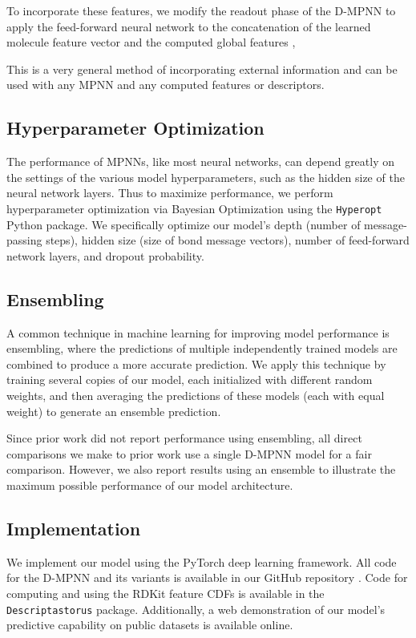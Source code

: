 \documentclass[journal=jcisd8,manuscript=article]{achemso}
\begin{document}
To incorporate these features, we modify the readout phase of the D-MPNN to apply the feed-forward neural network  to the concatenation of the learned molecule feature vector  and the computed global features ,

This is a very general method of incorporating external information and can be used with any MPNN and any computed features or descriptors.

\subsection{Hyperparameter Optimization}

The performance of MPNNs, like most neural networks, can depend greatly on the settings of the various model hyperparameters, such as the hidden size of the neural network layers. Thus to maximize performance, we perform hyperparameter optimization via Bayesian Optimization\cite{shahriari2016bayes} using the {\tt Hyperopt}\cite{hyperopt} Python package. We specifically optimize our model's depth (number of message-passing steps), hidden size (size of bond message vectors), number of feed-forward network layers, and dropout probability.

\subsection{Ensembling}

A common technique in machine learning for improving model performance is ensembling, where the predictions of multiple independently trained models are combined to produce a more accurate prediction\cite{dietterich2000ensemble}. We apply this technique by training several copies of our model, each initialized with different random weights, and then averaging the predictions of these models (each with equal weight) to generate an ensemble prediction.

Since prior work did not report performance using ensembling, all direct comparisons we make to prior work use a single D-MPNN model for a fair comparison. However, we also report results using an ensemble to illustrate the maximum possible performance of our model architecture.

\subsection{Implementation}

We implement our model using the PyTorch\cite{paszke2017pytorch} deep learning framework. All code for the D-MPNN and its variants is available in our GitHub repository \cite{chemprop_code}. Code for computing and using the RDKit feature CDFs is available in the \texttt{Descriptastorus} package\cite{descriptastorus}. Additionally, a web demonstration of our model's predictive capability on public datasets is available online\cite{chemprop_website}. 
\end{document}
